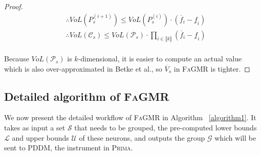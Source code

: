 \documentclass[runningheads]{llncs}
\newcommand{\ourtool}{\textsc{FaGMR}\xspace}
\newcommand{\prima}{\textsc{Prima}\xspace}
\begin{document}
\begin{proof}
\begin{equation*}
\begin{aligned}
&\therefore VoL(P^{(i+1)}_{s}) \leq VoL(P^{(i)}_{s}) \cdot (\overline{f}_{i}-\underline{f}_{i})\\
&\therefore VoL(\mathcal{C}_{s}) \leq VoL(\mathcal{P}_{s}) \cdot \prod_{i\in \llbracket  k \rrbracket}^{}(\overline{f}_{i} - \underline{f}_{i})
\end{aligned}
\end{equation*}
\\
Because $VoL(\mathcal{P}_{s})$ is $k$-dimensional, it is easier to compute an actual value which is also over-approximated in Betke et al., so $\overline{V}_{s}$ in \ourtool is tighter.

\end{proof}

%
%
%

\subsection{Detailed algorithm of \ourtool}\label{Subsec3.4}

We now present the detailed 
workflow of \ourtool in Algorithm ~\ref{algorithm1}.
It takes as input a set $\mathcal{S}$ that needs to be grouped,
the pre-computed lower bounds $\mathcal{L}$ and upper bounds $\mathcal{U}$ of these neurons, and
outputs the group $\mathcal{G}$ which will be sent to PDDM, the instrument in \prima.
\end{document}
